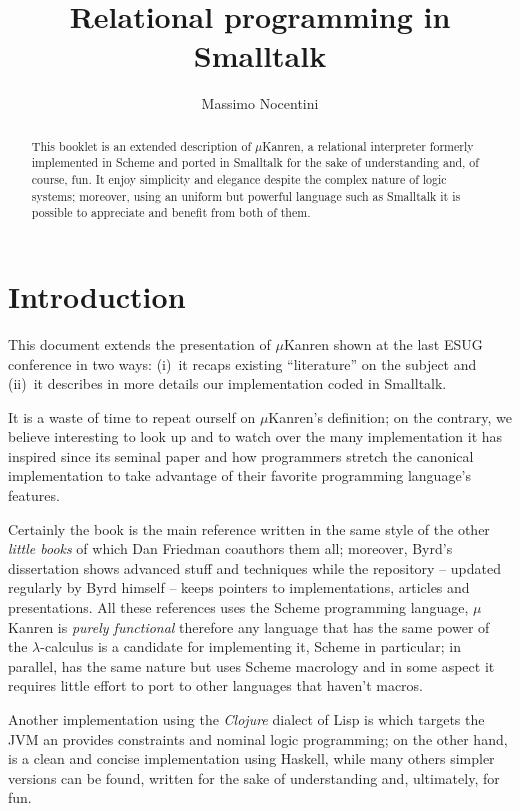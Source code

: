 \documentclass[a4paper,12pt]{article}
\author{Massimo Nocentini}
\title{Relational programming in Smalltalk}
\begin{document}
\maketitle

\begin{abstract}
This booklet is an extended description of $\mu$Kanren, a relational
interpreter formerly implemented in Scheme and ported in Smalltalk for the sake
of understanding and, of course, fun. It enjoy simplicity and elegance despite
the complex nature of logic systems; moreover, using an uniform but powerful
language such as Smalltalk it is possible to appreciate and benefit from both
of them.
\end{abstract}

\section*{Introduction}

This document extends the presentation of $\mu$Kanren shown at the last ESUG
conference \citep{ESUG2018} in two ways: (i)~it recaps existing ``literature''
on the subject and (ii)~it describes in more details our implementation coded
in Smalltalk.

It is a waste of time to repeat ourself on $\mu$Kanren's definition; on the
contrary, we believe interesting to look up and to watch over the many
implementation it has inspired since its seminal paper \citep{Hemann:muKanren}
and how programmers stretch the canonical implementation to take advantage of
their favorite programming language's features.

Certainly the book \citep{Friedman:Reasoned:Schemer} is the main reference
written in the same style of the other \emph{little books} of which Dan
Friedman coauthors them all; moreover, Byrd's dissertation \citep{Byrd:PhD}
shows advanced stuff and techniques while the repository
\citep{byrd:minikanren:repo} -- updated regularly by Byrd himself -- keeps
pointers to implementations, articles and presentations. All these references
uses the Scheme programming language, $\mu$Kanren is \emph{purely functional}
therefore any language that has the same power of the $\lambda$-calculus is a
candidate for implementing it, Scheme in particular; in parallel,
\citep{byrd:minikanren} has the same nature but uses Scheme macrology and in
some aspect it requires little effort to port to other languages that haven't
macros.

Another implementation using the \emph{Clojure} dialect of Lisp is
\citep{clojure:core.logic} which targets the JVM an provides constraints and
nominal logic programming; on the other hand, \citep{sullivan:microkanrenhs}
is a clean and concise implementation using Haskell, while many others simpler
versions can be found, written for the sake of understanding and, ultimately,
for fun.
\end{document}

